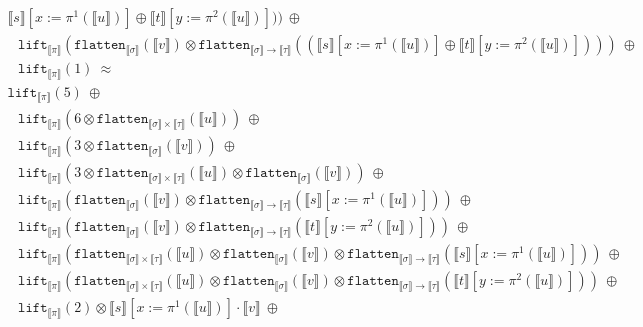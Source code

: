 \documentclass[runningheads,a4paper]{llncs}
\newcommand{\typeinterpret}[1]{\llbracket #1 \rrbracket}
\newcommand{\interpret}[1]{\llbracket #1 \rrbracket}
\newcommand{\arrtype}{\rightarrow}
\newcommand{\flatten}{\mathtt{flatten}}
\newcommand{\lift}{\mathtt{lift}}
\begin{document}
\begin{itemize}
\[\begin{array}{l}
    \interpret{s}[x:=\pi^1(\interpret{u})] \oplus
    \interpret{t}[y:=\pi^2(\interpret{u})]))\ \oplus \\
  \phantom{A}
  \lift_{\typeinterpret{\pi}}(
    \flatten_{\typeinterpret{\sigma}}(\interpret{v}) \otimes
    \flatten_{\typeinterpret{\sigma} \arrtype \typeinterpret{\tau}}(
    (\interpret{s}[x:=\pi^1(\interpret{u})] \oplus
    \interpret{t}[y:=\pi^2(\interpret{u})])))\ \oplus \\
  \phantom{A}
  \lift_{\typeinterpret{\pi}}(1)\ \approx \\
  \lift_{\typeinterpret{\pi}}(5)\ \oplus \\
  \phantom{A}
  \lift_{\typeinterpret{\pi}}(6 \otimes
    \flatten_{\typeinterpret{\sigma} \times \typeinterpret{\tau}}(
    \interpret{u}))\ \oplus \\
  \phantom{A}
  \lift_{\typeinterpret{\pi}}(3 \otimes \flatten_{\typeinterpret{
    \sigma}}(\interpret{v}))\ \oplus \\
  \phantom{A}
  \lift_{\typeinterpret{\pi}}(3 \otimes \flatten_{\typeinterpret{
    \sigma} \times \typeinterpret{\tau}}(\interpret{u}) \otimes
    \flatten_{\typeinterpret{\sigma}}(\interpret{v}))\ \oplus \\
  \phantom{A}
  \lift_{\typeinterpret{\pi}}(
    \flatten_{\typeinterpret{\sigma}}(\interpret{v}) \otimes
    \flatten_{\typeinterpret{\sigma} \arrtype \typeinterpret{\tau}}(
    \interpret{s}[x:=\pi^1(\interpret{u})]))\ \oplus \\
  \phantom{A}
  \lift_{\typeinterpret{\pi}}(
    \flatten_{\typeinterpret{\sigma}}(\interpret{v}) \otimes
    \flatten_{\typeinterpret{\sigma} \arrtype \typeinterpret{
    \tau}}(\interpret{t}[y:=\pi^2(\interpret{u})]))\ \oplus \\
  \phantom{A}
  \lift_{\typeinterpret{\pi}}(\flatten_{\typeinterpret{\sigma} \times
    \typeinterpret{\tau}}(\interpret{u}) \otimes
    \flatten_{\typeinterpret{\sigma}}(\interpret{v}) \otimes
    \flatten_{\typeinterpret{\sigma} \arrtype \typeinterpret{\tau}}(
    \interpret{s}[x:=\pi^1(\interpret{u})]))\ \oplus \\
  \phantom{A}
  \lift_{\typeinterpret{\pi}}(\flatten_{\typeinterpret{\sigma} \times
    \typeinterpret{\tau}}(\interpret{u}) \otimes
    \flatten_{\typeinterpret{\sigma}}(\interpret{v}) \otimes
    \flatten_{\typeinterpret{\sigma} \arrtype \typeinterpret{\tau}}(
    \interpret{t}[y:=\pi^2(\interpret{u})]))\ \oplus \\
  \phantom{A}
  \lift_{\typeinterpret{\pi}}(2) \otimes
    \interpret{s}[x:=\pi^1(\interpret{u})] \cdot \interpret{v}\ \oplus \\

\end{array}\]
\end{itemize}
\end{document}
